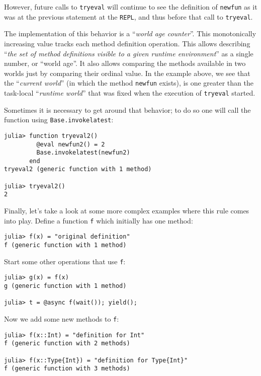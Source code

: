 \documentclass[
]{article}
\begin{document}
However, future calls to \texttt{tryeval} will continue to see the
definition of \texttt{newfun} as it was at the previous statement at the
\texttt{REPL}, and thus before that call to \texttt{tryeval}.

The implementation of this behavior is a ``\emph{world age counter}''.
This monotonically increasing value tracks each method definition
operation. This allows describing ``\emph{the set of method definitions
visible to a given runtime environment}'' as a single number, or ``world
age''. It also allows comparing the methods available in two worlds just
by comparing their ordinal value. In the example above, we see that the
``\emph{current world}'' (in which the method \texttt{newfun} exists),
is one greater than the task-local ``\emph{runtime world}'' that was
fixed when the execution of \texttt{tryeval} started.

Sometimes it is necessary to get around that behavior; to do so one will
call the function using \texttt{Base.invokelatest}:

\begin{verbatim}
julia> function tryeval2()
         @eval newfun2() = 2
         Base.invokelatest(newfun2)
       end
tryeval2 (generic function with 1 method)

julia> tryeval2()
2
\end{verbatim}

Finally, let's take a look at some more complex examples where this rule
comes into play. Define a function \texttt{f} which initially has one
method:

\begin{verbatim}
julia> f(x) = "original definition"
f (generic function with 1 method)
\end{verbatim}

Start some other operations that use \texttt{f}:

\begin{verbatim}
julia> g(x) = f(x)
g (generic function with 1 method)

julia> t = @async f(wait()); yield();
\end{verbatim}

Now we add some new methods to \texttt{f}:

\begin{verbatim}
julia> f(x::Int) = "definition for Int"
f (generic function with 2 methods)

julia> f(x::Type{Int}) = "definition for Type{Int}"
f (generic function with 3 methods)
\end{verbatim}
\end{document}
